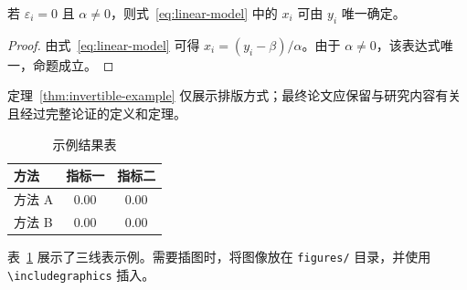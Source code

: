 \begin{theorem}[示例命题]
若 $\varepsilon_i=0$ 且 $\alpha\ne0$，则式~\eqref{eq:linear-model} 中的 $x_i$ 可由 $y_i$ 唯一确定。
\label{thm:invertible-example}
\end{theorem}

\begin{proof}
由式~\eqref{eq:linear-model} 可得 $x_i=(y_i-\beta)/\alpha$。由于 $\alpha\ne0$，该表达式唯一，命题成立。
\end{proof}

定理~\ref{thm:invertible-example} 仅展示排版方式；最终论文应保留与研究内容有关且经过完整论证的定义和定理。

\begin{table}[htbp]
  \centering
  \caption{示例结果表}
  \label{tab:example}
  \begin{tabular}{lcc}
    \toprule
    方法 & 指标一 & 指标二 \\
    \midrule
    方法 A & 0.00 & 0.00 \\
    方法 B & 0.00 & 0.00 \\
    \bottomrule
  \end{tabular}
\end{table}

表~\ref{tab:example} 展示了三线表示例。需要插图时，将图像放在 \texttt{figures/} 目录，并使用 \verb|\includegraphics| 插入。
